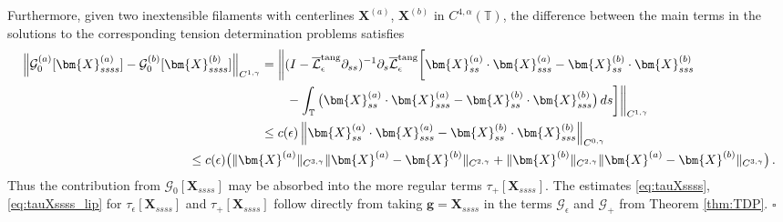 \documentclass[11pt,reqno]{amsart}
\newcommand{\T}{\mathbb{T}}
\newcommand{\X}{\bm{X}}
\newcommand{\p}{\partial}
\newcommand{\norm}[1]{\left\lVert #1 \right\rVert}
\newcommand{\mc}[1]{\mathcal{#1}}
\theoremstyle{definition}
\begin{document}
Furthermore, given two inextensible filaments with centerlines $\X^{(a)}$, $\X^{(b)}$ in $C^{4,\alpha}(\T)$, the difference between the main terms in the solutions to the corresponding tension determination problems satisfies 
\begin{equation}
\begin{aligned}
  \norm{\mc{G}_0^{(a)}[\X_{ssss}^{(a)}]-\mc{G}_0^{(b)}[\X_{ssss}^{(b)}]}_{C^{1,\gamma}} 
  &= \bigg\|(I- \overline{\mc{L}}_\epsilon^{\rm tang}\p_{ss})^{-1}\p_s\overline{\mc{L}}_\epsilon^{\rm tang}\bigg[\X_{ss}^{(a)}\cdot\X_{sss}^{(a)}-\X_{ss}^{(b)}\cdot\X_{sss}^{(b)}\\
  &\qquad -\int_{\T}\big(\X_{ss}^{(a)}\cdot\X_{sss}^{(a)}-\X_{ss}^{(b)}\cdot\X_{sss}^{(b)}\big)\,ds \bigg]\bigg\|_{C^{1,\gamma}}\\
  &\le c(\epsilon)\norm{\X_{ss}^{(a)}\cdot\X_{sss}^{(a)}-\X_{ss}^{(b)}\cdot\X_{sss}^{(b)}}_{C^{0,\gamma}}\\
  &\hspace{-2cm}\le c(\epsilon)\big(\|\X^{(a)}\|_{C^{3,\gamma}}\|\X^{(a)}-\X^{(b)}\|_{C^{2,\gamma}} + \|\X^{(b)}\|_{C^{2,\gamma}}\|\X^{(a)}-\X^{(b)}\|_{C^{3,\gamma}} \big)\,.
\end{aligned}
\end{equation}
%
%
Thus the contribution from $\mc{G}_0[\X_{ssss}]$ may be absorbed into the more regular terms $\tau_+[\X_{ssss}]$. The estimates \eqref{eq:tauXssss}, \eqref{eq:tauXssss_lip} for $\tau_\epsilon[\X_{ssss}]$ and $\tau_+[\X_{ssss}]$ follow directly from taking $\bm{g}=\X_{ssss}$ in the terms $\mc{G}_\epsilon$ and $\mc{G}_+$ from Theorem \ref{thm:TDP}.
%
%
%
\hfill $\square$






\end{document}
